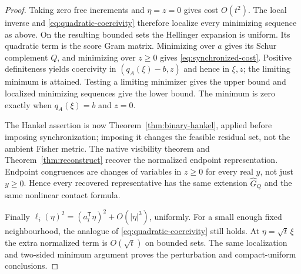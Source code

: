 \begin{proof}
Taking zero free increments and $\eta=z=0$ gives cost $O(t^2)$. The local inverse and \eqref{eq:quadratic-coercivity} therefore localize every minimizing sequence as above. On the resulting bounded sets the Hellinger expansion is uniform. Its quadratic term is the score Gram matrix. Minimizing over $a$ gives its Schur complement $Q$, and minimizing over $z\ge0$ gives \eqref{eq:synchronized-cost}. Positive definiteness yields coercivity in $(q_A(\xi)-b,z)$ and hence in $\xi,z$; the limiting minimum is attained. Testing a limiting minimizer gives the upper bound and localized minimizing sequences give the lower bound. The minimum is zero exactly when $q_A(\xi)=b$ and $z=0$.

The Hankel assertion is now Theorem~\ref{thm:binary-hankel}, applied before imposing synchronization; imposing it changes the feasible residual set, not the ambient Fisher metric. The native visibility theorem and Theorem~\ref{thm:reconstruct} recover the normalized endpoint representation. Endpoint congruences are changes of variables in $z\ge0$ for every real $y$, not just $y\ge0$. Hence every recovered representative has the same extension $\widehat G_Q$ and the same nonlinear contact formula.

Finally $\ell_i(\eta)^2=(a_i^{\mathsf T}\eta)^2+O(|\eta|^3)$, uniformly. For a small enough fixed neighbourhood, the analogue of \eqref{eq:quadratic-coercivity} still holds. At $\eta=\sqrt t\,\xi$ the extra normalized term is $O(\sqrt t)$ on bounded sets. The same localization and two-sided minimum argument proves the perturbation and compact-uniform conclusions.
\end{proof}

